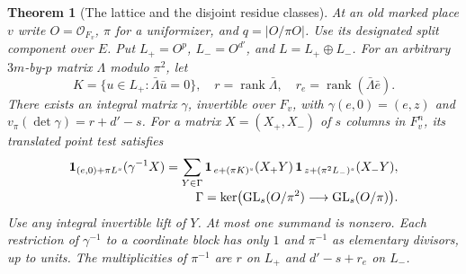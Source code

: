 \documentclass[a4paper,11pt]{article}
\newtheorem{theorem}[proposition]{Theorem}
\theoremstyle{definition}
\theoremstyle{remark}
\numberwithin{equation}{section}
\newcommand{\GL}{\operatorname{GL}}
\begin{document}
\begin{theorem}[The lattice and the disjoint residue classes]
\leavevmode\label{thm:splitlattice811}
At an old marked place \(v\) write \(O=\mathcal O_{F_v}\),
\(\pi\) for a uniformizer, and \(q=|O/\pi O|\). Use its
designated split component over \(E\). Put \(L_+=O^p\),
\(L_-=O^{d'}\), and \(L=L_+\oplus L_-\). For an arbitrary
\(3m\)-by-\(p\) matrix \(\Lambda\) modulo \(\pi^2\), let
\[
 K=\{u\in L_+:\bar\Lambda\bar u=0\},\quad
 r=\operatorname{rank}\bar\Lambda,\quad
 r_e=\operatorname{rank}(\bar\Lambda\bar e).
\]
There exists an integral matrix \(\gamma\), invertible over
\(F_v\), with \(\gamma(e,0)=(e,z)\) and
\(v_\pi(\det\gamma)=r+d'-s\). For a matrix \(X=(X_+,X_-)\)
of \(s\) columns in \(F_v^n\), its translated point test satisfies
\begin{equation}
\begin{split}
 {\bf1}_{(e,0)+\pi L^s}(\gamma^{-1}X)
  =\sum_{Y\in\Gamma}
   {\bf1}_{\,e+(\pi K)^s}(X_+Y)\,
   {\bf1}_{\,z+(\pi^2L_-)^s}(X_-Y),\\[-2pt]
 \Gamma=\ker\bigl(\GL_s(O/\pi^2)\longrightarrow\GL_s(O/\pi)\bigr).
\end{split}
\label{eq:localpartition811}
\end{equation}
Use any integral invertible lift of \(Y\). At most one summand
is nonzero. Each restriction of \(\gamma^{-1}\) to a coordinate
block has only \(1\) and \(\pi^{-1}\) as elementary divisors,
up to units. The multiplicities of \(\pi^{-1}\) are \(r\) on
\(L_+\) and \(d'-s+r_e\) on \(L_-\).
\end{theorem}
\end{document}
